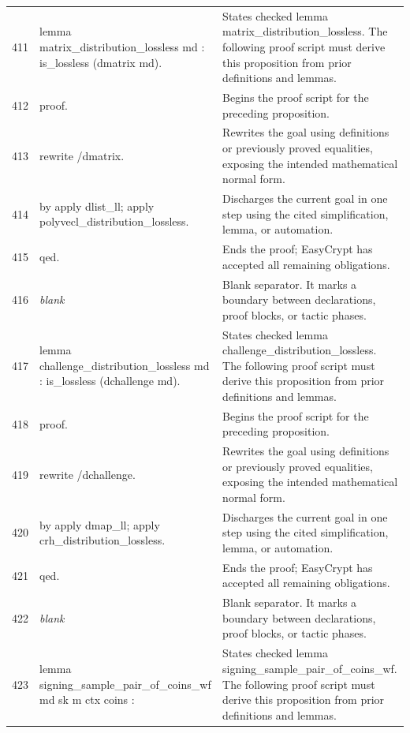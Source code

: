\documentclass[10pt]{article}
\begin{document}
\begin{longtable}{r L{0.53\textwidth} L{0.37\textwidth}}
411 & {\ttfamily\scriptsize lemma matrix\_distribution\_lossless md : is\_lossless (dmatrix md).} & States checked lemma matrix\_distribution\_lossless.  The following proof script must derive this proposition from prior definitions and lemmas. \\
412 & {\ttfamily\scriptsize proof.} & Begins the proof script for the preceding proposition. \\
413 & {\ttfamily\scriptsize rewrite /dmatrix.} & Rewrites the goal using definitions or previously proved equalities, exposing the intended mathematical normal form. \\
414 & {\ttfamily\scriptsize by apply dlist\_ll; apply polyvecl\_distribution\_lossless.} & Discharges the current goal in one step using the cited simplification, lemma, or automation. \\
415 & {\ttfamily\scriptsize qed.} & Ends the proof; EasyCrypt has accepted all remaining obligations. \\
416 & {\ttfamily\scriptsize \emph{blank}} & Blank separator.  It marks a boundary between declarations, proof blocks, or tactic phases. \\
417 & {\ttfamily\scriptsize lemma challenge\_distribution\_lossless md : is\_lossless (dchallenge md).} & States checked lemma challenge\_distribution\_lossless.  The following proof script must derive this proposition from prior definitions and lemmas. \\
418 & {\ttfamily\scriptsize proof.} & Begins the proof script for the preceding proposition. \\
419 & {\ttfamily\scriptsize rewrite /dchallenge.} & Rewrites the goal using definitions or previously proved equalities, exposing the intended mathematical normal form. \\
420 & {\ttfamily\scriptsize by apply dmap\_ll; apply crh\_distribution\_lossless.} & Discharges the current goal in one step using the cited simplification, lemma, or automation. \\
421 & {\ttfamily\scriptsize qed.} & Ends the proof; EasyCrypt has accepted all remaining obligations. \\
422 & {\ttfamily\scriptsize \emph{blank}} & Blank separator.  It marks a boundary between declarations, proof blocks, or tactic phases. \\
423 & {\ttfamily\scriptsize lemma signing\_sample\_pair\_of\_coins\_wf md sk m ctx coins :} & States checked lemma signing\_sample\_pair\_of\_coins\_wf.  The following proof script must derive this proposition from prior definitions and lemmas. \\

\end{longtable}
\end{document}
